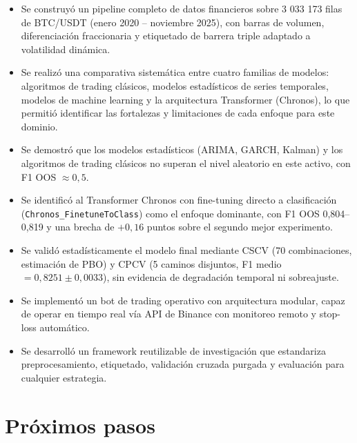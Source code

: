 \begin{itemize}
  \item Se construyó un pipeline completo de datos financieros sobre 3 033 173 filas de BTC/USDT (enero 2020 -- noviembre 2025), con barras de volumen, diferenciación fraccionaria y etiquetado de barrera triple adaptado a volatilidad dinámica.
  \item Se realizó una comparativa sistemática entre cuatro familias de modelos: algoritmos de trading clásicos, modelos estadísticos de series temporales, modelos de machine learning y la arquitectura Transformer (Chronos), lo que permitió identificar las fortalezas y limitaciones de cada enfoque para este dominio.
  \item Se demostró que los modelos estadísticos (ARIMA, GARCH, Kalman) y los algoritmos de trading clásicos no superan el nivel aleatorio en este activo, con F1 OOS $\approx 0,5$.
  \item Se identificó al Transformer Chronos con fine-tuning directo a clasificación (\texttt{Chronos\_FinetuneToClass}) como el enfoque dominante, con F1 OOS 0,804--0,819 y una brecha de $+0,16$ puntos sobre el segundo mejor experimento.
  \item Se validó estadísticamente el modelo final mediante CSCV (70 combinaciones, estimación de PBO) y CPCV (5 caminos disjuntos, F1 medio $= 0,8251 \pm 0,0033$), sin evidencia de degradación temporal ni sobreajuste.
  \item Se implementó un bot de trading operativo con arquitectura modular, capaz de operar en tiempo real vía API de Binance con monitoreo remoto y stop-loss automático.
  \item Se desarrolló un framework reutilizable de investigación que estandariza preprocesamiento, etiquetado, validación cruzada purgada y evaluación para cualquier estrategia.
\end{itemize}


\section{Próximos pasos}

